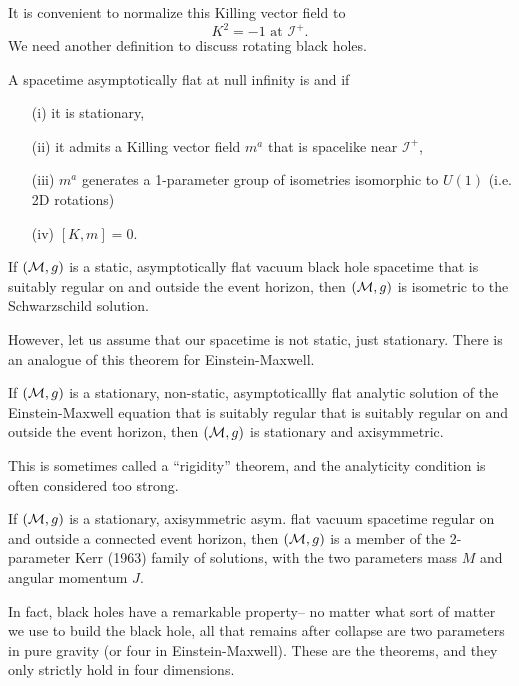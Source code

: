 It is convenient to normalize this Killing vector field to
\begin{equation}
    K^2 = -1 \text{ at } \mathcal{I}^+.
\end{equation}
We need another definition to discuss rotating black holes.
\begin{defn}
    A spacetime asymptotically flat at null infinity is  and  if 
    \begin{enumerate}
        \item[(i)] it is stationary,
        \item[(ii)] it admits a Killing vector field $m^a$ that is spacelike near $\mathcal{I}^+$,
        \item[(iii)] $m^a$ generates a 1-parameter group of isometries isomorphic to $U(1)$ (i.e. 2D rotations)
        \item[(iv)] $[K,m]=0$.
    \end{enumerate}
\end{defn}
\begin{thm}
    If $(\mathcal{M},g)$ is a static, asymptotically flat vacuum black hole spacetime that is suitably regular on and outside the event horizon, then $(\mathcal{M},g)$ is isometric to the Schwarzschild solution.
\end{thm}
However, let us assume that our spacetime is not static, just stationary. There is an analogue of this theorem for Einstein-Maxwell.
\begin{thm}
    If $(\mathcal{M},g)$ is a stationary, non-static, asymptoticallly flat analytic solution of the Einstein-Maxwell equation that is suitably regular that is suitably regular on and outside the event horizon, then $(\mathcal{M},g)$ is stationary and axisymmetric.
\end{thm}
This is sometimes called a ``rigidity'' theorem, and the analyticity condition is often considered too strong.
\begin{thm}
    If $(\mathcal{M},g)$ is a stationary, axisymmetric asym. flat vacuum spacetime regular on and outside a connected event horizon, then $(\mathcal{M},g)$ is a member of the 2-parameter Kerr (1963) family of solutions, with the two parameters mass $M$ and angular momentum $J$.
\end{thm}
In fact, black holes have a remarkable property-- no matter what sort of matter we use to build the black hole, all that remains after collapse are two parameters in pure gravity (or four in Einstein-Maxwell). These are the  theorems, and they only strictly hold in four dimensions.

